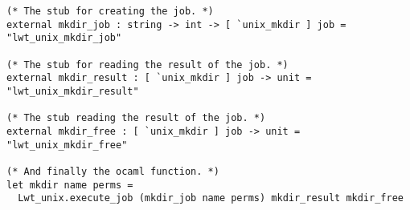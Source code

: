 \lstset{language=[Objective]Caml}\begin{lstlisting}
(* The stub for creating the job. *)
external mkdir_job : string -> int -> [ `unix_mkdir ] job = "lwt_unix_mkdir_job"

(* The stub for reading the result of the job. *)
external mkdir_result : [ `unix_mkdir ] job -> unit = "lwt_unix_mkdir_result"

(* The stub reading the result of the job. *)
external mkdir_free : [ `unix_mkdir ] job -> unit = "lwt_unix_mkdir_free"

(* And finally the ocaml function. *)
let mkdir name perms =
  Lwt_unix.execute_job (mkdir_job name perms) mkdir_result mkdir_free

\end{lstlisting}